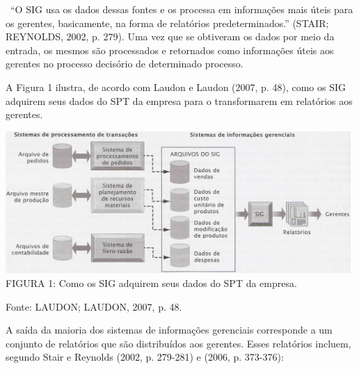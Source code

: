 \documentclass[a4paper]{article}
\begin{document}
{
\textsf{\ {}``O SIG usa os dados dessas fontes e os processa em informa\c{c}\~oes mais \'uteis para os gerentes,
basicamente, na forma de relat\'orios predeterminados.'' (STAIR; REYNOLDS, 2002, p. 279). Uma vez que se obtiveram os
dados por meio da entrada, os mesmos s\~ao processados e retornados como informa\c{c}\~oes \'uteis aos gerentes no
processo decis\'orio de determinado processo. }}

{
\textsf{A Figura 1 ilustra, de acordo com Laudon e Laudon (2007, p. 48), como os SIG adquirem seus dados do SPT da
empresa para o transformarem em relat\'orios aos gerentes.}}

{
 \includegraphics[width=13.115cm,height=5.413cm]{monograph-img001.jpg} \textsf{\MakeUppercase{ \newline
FIGURA }}\textsf{1: Como os SIG adquirem seus dados do SPT da empresa. }}

{\sffamily
Fonte: LAUDON; LAUDON, 2007, p. 48. }

{
\textsf{A sa\'ida da maioria dos sistemas de informa\c{c}\~oes gerenciais corresponde a um conjunto de relat\'orios que
s\~ao distribu\'idos aos gerentes. Esses relat\'orios incluem, segundo Stair e Reynolds (2002, p. 279-281) e (2006, p.
373-376):}}
\end{document}
